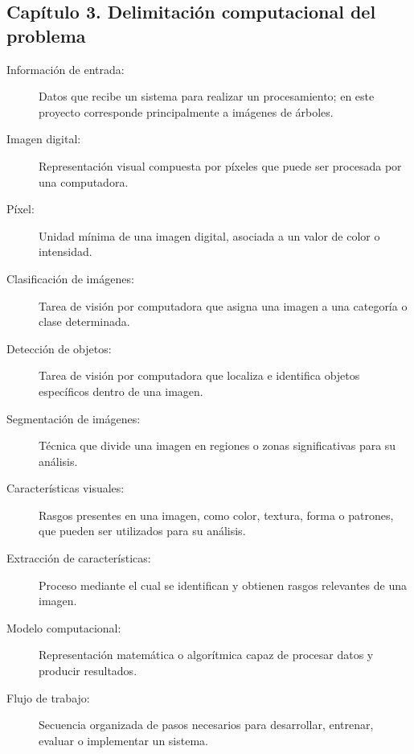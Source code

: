 \subsection*{Capítulo 3. Delimitación computacional del problema}
\begin{description}
    \item[Información de entrada:] Datos que recibe un sistema para realizar un procesamiento; en este proyecto corresponde principalmente a imágenes de árboles.
    \item[Imagen digital:] Representación visual compuesta por píxeles que puede ser procesada por una computadora.
    \item[Píxel:] Unidad mínima de una imagen digital, asociada a un valor de color o intensidad.
    \item[Clasificación de imágenes:] Tarea de visión por computadora que asigna una imagen a una categoría o clase determinada.
    \item[Detección de objetos:] Tarea de visión por computadora que localiza e identifica objetos específicos dentro de una imagen.
    \item[Segmentación de imágenes:] Técnica que divide una imagen en regiones o zonas significativas para su análisis.
    \item[Características visuales:] Rasgos presentes en una imagen, como color, textura, forma o patrones, que pueden ser utilizados para su análisis.
    \item[Extracción de características:] Proceso mediante el cual se identifican y obtienen rasgos relevantes de una imagen.
    \item[Modelo computacional:] Representación matemática o algorítmica capaz de procesar datos y producir resultados.
    \item[Flujo de trabajo:] Secuencia organizada de pasos necesarios para desarrollar, entrenar, evaluar o implementar un sistema.
\end{description}
